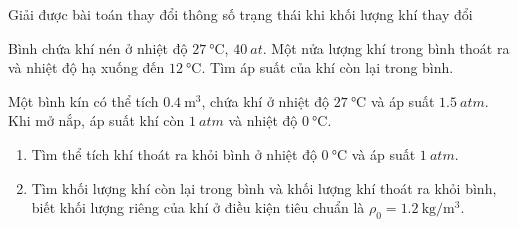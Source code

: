 \begin{dang}{Giải được bài toán thay đổi thông số trạng thái khi khối lượng khí thay đổi}
	{Bình chứa khí nén ở nhiệt độ $\SI{27}{\celsius}$, $\SI{40}{at}$. Một nửa lượng khí trong bình thoát ra và nhiệt độ hạ xuống đến $\SI{12}{\celsius}$. Tìm áp suất của khí còn lại trong bình.
	
}
{}
	
{Một bình kín có thể tích $\SI{0.4}{\meter^3}$, chứa khí ở nhiệt độ $\SI{27}{\celsius}$ và áp suất $\SI{1.5}{atm}$. Khi mở nắp, áp suất khí còn $\SI{1}{atm}$ và nhiệt độ $\SI{0}{\celsius}$.
	\begin{enumerate}[label=\alph*)]
		\item Tìm thể tích khí thoát ra khỏi bình ở nhiệt độ $\SI{0}{\celsius}$ và áp suất $\SI{1}{atm}$.
		\item Tìm khối lượng khí còn lại trong bình và khối lượng khí thoát ra khỏi bình, biết khối lượng riêng của khí ở điều kiện tiêu chuẩn là $\rho_0=\SI{1.2}{\kilogram/\meter^3}$.
	\end{enumerate}

}
\end{dang}
